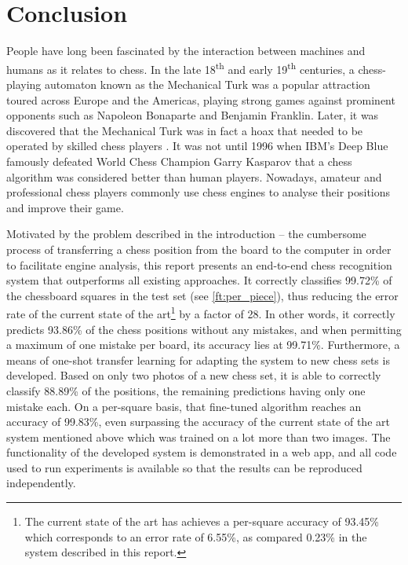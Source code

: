 \documentclass[../report.tex]{subfiles}
\begin{document}
\chapter{Conclusion}
\label{chap:conclusion}

People have long been fascinated by the interaction between machines and humans as it relates to chess.
In the late 18\textsuperscript{th} and early 19\textsuperscript{th} centuries, a chess-playing automaton known as the Mechanical Turk was a popular attraction toured across Europe and the Americas, playing strong games against prominent opponents such as Napoleon Bonaparte and Benjamin Franklin.
Later, it was discovered that the Mechanical Turk was in fact a hoax that needed to be operated by skilled chess players \cite{standage2003}.
It was not until 1996 when IBM's Deep Blue famously defeated World Chess Champion Garry Kasparov that a chess algorithm was considered better than human players.
Nowadays, amateur and professional chess players commonly use chess engines to analyse their positions and improve their game.

Motivated by the problem described in the introduction -- the cumbersome process of transferring a chess position from the board to the computer in order to facilitate engine analysis, this report presents an end-to-end chess recognition system that outperforms all existing approaches.
It correctly classifies 99.72\% of the chessboard squares in the test set (see \cref{ft:per_piece}), thus reducing the error rate of the current state of the art\footnote{The current state of the art has achieves a per-square accuracy of 93.45\% \cite{mehta2020} which corresponds to an error rate of 6.55\%, as compared 0.23\% in the system described in this report.} by a factor of 28.
In other words, it correctly predicts 93.86\% of the chess positions without any mistakes, and when permitting a maximum of one mistake per board, its accuracy lies at 99.71\%.
Furthermore, a means of one-shot transfer learning for adapting the system to new chess sets is developed.
Based on only two photos of a new chess set, it is able to correctly classify 88.89\% of the positions, the remaining predictions having only one mistake each.
On a per-square basis, that fine-tuned algorithm reaches an accuracy of 99.83\%, even surpassing the accuracy of the current state of the art system mentioned above which was trained on a lot more than two images.
The functionality of the developed system is demonstrated in a web app, and all code used to run experiments is available so that the results can be reproduced independently.
\end{document}
